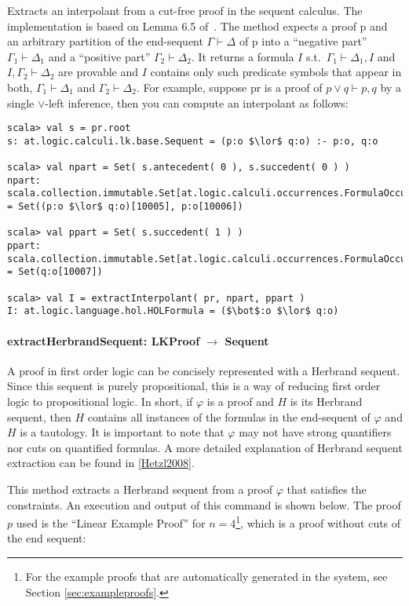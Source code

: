 \documentclass[a4paper, 11pt]{report}
\newcommand{\seq}{\vdash}	%
\begin{document}
Extracts an interpolant from a cut-free proof in the sequent calculus. The
implementation is based on Lemma 6.5 of~\cite{Takeuti87Proof}. The method expects
a proof p and an arbitrary partition of the end-sequent $\Gamma \seq \Delta$ of p into a 
``negative part'' $\Gamma_1\seq\Delta_1$ and a ``positive part'' $\Gamma_2 \seq \Delta_2$.
It returns a formula $I$ s.t.\ $\Gamma_1\seq\Delta_1, I$ and $I,\Gamma_2\seq\Delta_2$
are provable and $I$ contains only such predicate symbols that appear in both, $\Gamma_1\seq\Delta_1$
and $\Gamma_2\seq\Delta_2$. For example, suppose pr is a proof of $p \lor q \seq p, q$
by a single $\lor$-left inference, then you can compute an interpolant as follows:
\begin{lstlisting}
scala> val s = pr.root
s: at.logic.calculi.lk.base.Sequent = (p:o $\lor$ q:o) :- p:o, q:o

scala> val npart = Set( s.antecedent( 0 ), s.succedent( 0 ) )
npart: scala.collection.immutable.Set[at.logic.calculi.occurrences.FormulaOccurrence] = Set((p:o $\lor$ q:o)[10005], p:o[10006])

scala> val ppart = Set( s.succedent( 1 ) )
ppart: scala.collection.immutable.Set[at.logic.calculi.occurrences.FormulaOccurrence] = Set(q:o[10007])

scala> val I = extractInterpolant( pr, npart, ppart )
I: at.logic.language.hol.HOLFormula = ($\bot$:o $\lor$ q:o)
\end{lstlisting}

\paragraph{\textbf{extractHerbrandSequent: LKProof $\rightarrow$ Sequent}}

A proof in first order logic can be concisely represented with a Herbrand
sequent. Since this sequent is purely propositional, this is a way of reducing
first order logic to propositional logic. In short, if $\varphi$ is a proof and
$H$ is its Herbrand sequent, then $H$ contains all instances of the formulas in
the end-sequent of $\varphi$ and $H$ is a tautology. It is important to note
that $\varphi$ may not have strong quantifiers nor cuts on quantified formulas.
A more detailed explanation of Herbrand sequent extraction can be found in
\ref{Hetzl2008}. 

This method extracts a Herbrand sequent from a proof $\varphi$ that satisfies
the constraints. 
An execution and output of this command is shown below. The proof $p$ used is the
``Linear Example Proof'' for $n=4$\footnote{For the example proofs that are
automatically generated in the system, see Section \ref{sec:exampleproofs}.},
which is a proof without cuts of the end sequent:
\end{document}
